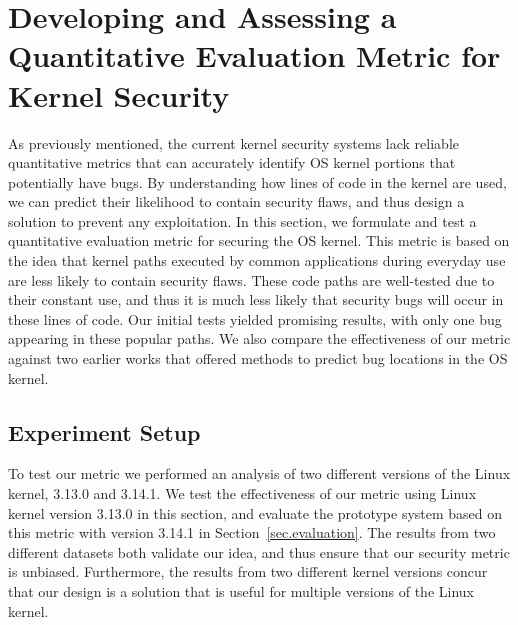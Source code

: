 \section{Developing and Assessing a Quantitative Evaluation Metric for Kernel Security}
\label{sec.metric}

As previously mentioned, the current kernel
security systems lack reliable quantitative metrics that
can accurately identify OS kernel portions that potentially have
bugs. By understanding how %
lines of code in the kernel are used, %
we can predict their likelihood to contain security flaws, and thus
design a solution to prevent any exploitation.
In this section, we formulate and test
a quantitative evaluation metric for securing the OS kernel. 
This metric is based on the idea that kernel paths executed by common applications
during everyday use are less likely to contain security flaws. 
These code paths are well-tested due to their constant use, and
thus it is much less likely that security bugs will occur in these lines of code.
Our initial tests yielded promising results, with only one
bug appearing in these popular paths.  We also compare the effectiveness of our
metric against two earlier works that offered methods to predict bug
locations in the OS kernel.

\subsection{Experiment Setup}\label{sec-setup}
To test our metric we performed an analysis of two different versions of
the Linux kernel, 3.13.0 and 3.14.1. 
We test the effectiveness of our metric using Linux kernel version 3.13.0 in this section, 
and evaluate the prototype system based on this metric with version 3.14.1 in 
Section~\ref{sec.evaluation}. The results from two different datasets both validate
our idea, and thus ensure that our security metric is unbiased. Furthermore,
the results from two different kernel versions concur that our design is 
a solution that is useful for multiple versions of the Linux kernel. 


